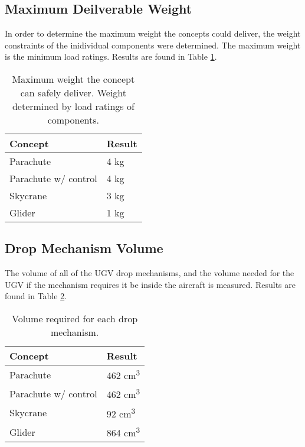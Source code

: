 \documentclass[]{auvsi_doc}
\begin{document}
	\subsection{Maximum Deilverable Weight}

	
	In order to determine the maximum weight the concepts could deliver, the weight constraints of the inidividual components were determined. The maximum weight is the minimum load ratings. Results are found in Table \ref{weight}.



	\begin{table}[!h]
\centering

\caption{Maximum weight the concept can safely deliver. Weight determined by load ratings of components.}
\label{weight}
	\begin{tabular}{|l|l|}
		\hline
		\textbf{Concept}       & \textbf{Result} \\
		\hline
		Parachute              &         4 kg        \\
		Parachute w/ control   &          4 kg       \\
		Skycrane               &        3 kg         \\
		Glider                 & 		1 kg	 \\
		\hline
	\end{tabular}
	\end{table}

	\subsection{Drop Mechanism Volume}

	The volume of all of the UGV drop mechanisms, and the volume needed for the UGV if the mechanism requires it be inside the aircraft is measured. Results are found in Table \ref{volume}.


	\begin{table}[!h]
\centering

\caption{Volume required for each drop mechanism.}
\label{volume}
	\begin{tabular}{|l|l|}
		\hline
		\textbf{Concept}       & \textbf{Result} \\
		\hline
		Parachute              &        462 cm\textsuperscript{3}         \\
		Parachute w/ control   &    462 cm\textsuperscript{3}             \\
		Skycrane               &          92 cm\textsuperscript{3}       \\
		Glider                 & 		864 cm\textsuperscript{3}	 \\
		\hline
	\end{tabular}
	\end{table}
\end{document}

